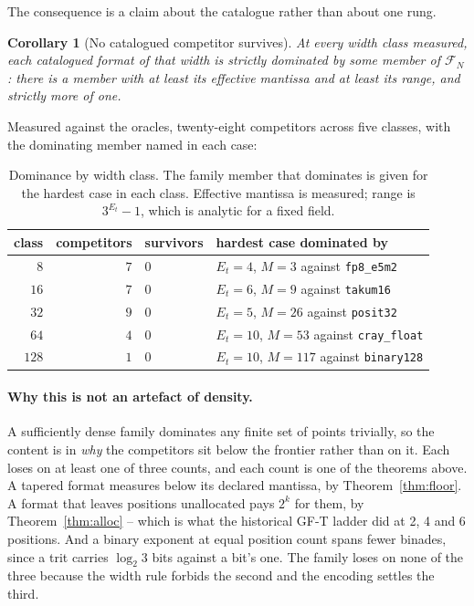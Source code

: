 \documentclass[11pt]{article}
\newtheorem{corollary}{Corollary}
\theoremstyle{definition}
\begin{document}
The consequence is a claim about the catalogue rather than about one rung.

\begin{corollary}[No catalogued competitor survives]
\label{cor:nosurvivors}
At every width class measured, each catalogued format of that width is strictly
dominated by some member of $\mathcal{F}_N$: there is a member with at least its
effective mantissa and at least its range, and strictly more of one.
\end{corollary}

Measured against the oracles, twenty-eight competitors across five classes, with
the dominating member named in each case:

\begin{table}[t]\centering
\caption{Dominance by width class. The family member that dominates is given for
the hardest case in each class. Effective mantissa is measured; range is
$3^{E_t}-1$, which is analytic for a fixed field.}
\label{tab:nosurvivors}
\begin{tabular}{rrll}
\toprule
class & competitors & survivors & hardest case dominated by \\
\midrule
$8$   & $7$ & $0$ & $E_t{=}4$, $M{=}3$ against \texttt{fp8\_e5m2} \\
$16$  & $7$ & $0$ & $E_t{=}6$, $M{=}9$ against \texttt{takum16} \\
$32$  & $9$ & $0$ & $E_t{=}5$, $M{=}26$ against \texttt{posit32} \\
$64$  & $4$ & $0$ & $E_t{=}10$, $M{=}53$ against \texttt{cray\_float} \\
$128$ & $1$ & $0$ & $E_t{=}10$, $M{=}117$ against \texttt{binary128} \\
\bottomrule
\end{tabular}
\end{table}

\paragraph{Why this is not an artefact of density.} A sufficiently dense family
dominates any finite set of points trivially, so the content is in \emph{why} the
competitors sit below the frontier rather than on it. Each loses on at least one
of three counts, and each count is one of the theorems above. A tapered format
measures below its declared mantissa, by Theorem~\ref{thm:floor}. A format that
leaves positions unallocated pays $2^k$ for them, by Theorem~\ref{thm:alloc} --
which is what the historical GF-T ladder did at 2, 4 and 6 positions. And a binary
exponent at equal position count spans fewer binades, since a trit carries
$\log_2 3$ bits against a bit's one. The family loses on none of the three because
the width rule forbids the second and the encoding settles the third.
\end{document}
